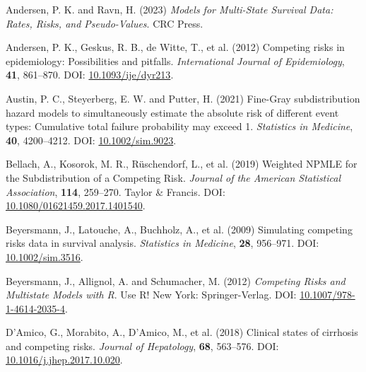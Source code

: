 \documentclass[
  letterpaper,
  DIV=11,
  numbers=noendperiod]{scrreprt}
\newlength{\cslhangindent}
\newlength{\cslentryspacingunit} %
\newenvironment{CSLReferences}[2] %
 {%
  \setlength{\parindent}{0pt}
  \ifodd #1
  \let\oldpar\par
  \def\par{\hangindent=\cslhangindent\oldpar}
  \fi
  \setlength{\parskip}{#2\cslentryspacingunit}
 }%
 {}
\begin{document}

\hypertarget{refs-5}{}
\begin{CSLReferences}{1}{0}
\leavevmode{}%
Andersen, P. K. and Ravn, H. (2023) \emph{Models for {Multi-State
Survival Data}: {Rates}, {Risks}, and {Pseudo-Values}}. CRC Press.

\leavevmode{}%
Andersen, P. K., Geskus, R. B., de Witte, T., et al. (2012) Competing
risks in epidemiology: Possibilities and pitfalls. \emph{International
Journal of Epidemiology}, \textbf{41}, 861--870. DOI:
\href{https://doi.org/10.1093/ije/dyr213}{10.1093/ije/dyr213}.

\leavevmode{}%
Austin, P. C., Steyerberg, E. W. and Putter, H. (2021) Fine-{Gray}
subdistribution hazard models to simultaneously estimate the absolute
risk of different event types: {Cumulative} total failure probability
may exceed 1. \emph{Statistics in Medicine}, \textbf{40}, 4200--4212.
DOI: \href{https://doi.org/10.1002/sim.9023}{10.1002/sim.9023}.

\leavevmode{}%
Bellach, A., Kosorok, M. R., Rüschendorf, L., et al. (2019) Weighted
{NPMLE} for the {Subdistribution} of a {Competing Risk}. \emph{Journal
of the American Statistical Association}, \textbf{114}, 259--270. Taylor
\& Francis. DOI:
\href{https://doi.org/10.1080/01621459.2017.1401540}{10.1080/01621459.2017.1401540}.

\leavevmode{}%
Beyersmann, J., Latouche, A., Buchholz, A., et al. (2009) Simulating
competing risks data in survival analysis. \emph{Statistics in
Medicine}, \textbf{28}, 956--971. DOI:
\href{https://doi.org/10.1002/sim.3516}{10.1002/sim.3516}.

\leavevmode{}%
Beyersmann, J., Allignol, A. and Schumacher, M. (2012) \emph{Competing
{Risks} and {Multistate Models} with {R}}. Use {R}! New York:
Springer-Verlag. DOI:
\href{https://doi.org/10.1007/978-1-4614-2035-4}{10.1007/978-1-4614-2035-4}.

\leavevmode{}%
D'Amico, G., Morabito, A., D'Amico, M., et al. (2018) Clinical states of
cirrhosis and competing risks. \emph{Journal of Hepatology},
\textbf{68}, 563--576. DOI:
\href{https://doi.org/10.1016/j.jhep.2017.10.020}{10.1016/j.jhep.2017.10.020}.


\end{CSLReferences}
\end{document}
